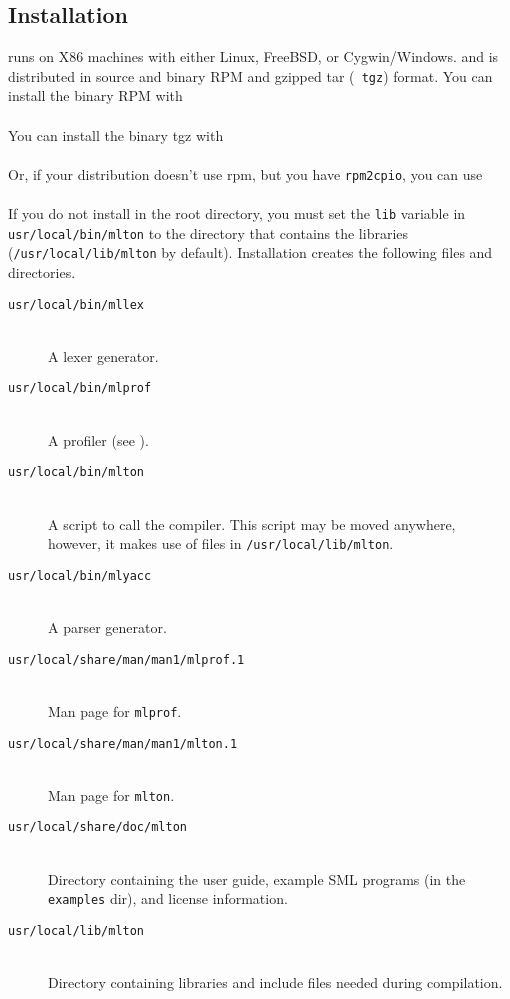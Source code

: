 
\subsection{Installation}

{\mlton} runs on X86 machines with either Linux, FreeBSD, or Cygwin/Windows.
and is distributed in source and binary RPM and gzipped tar ({\tt
tgz}) format.  You can install the binary RPM with\\
\hspace*{2em}{\tt rpm -i mlton-\version-1.i386.rpm}\\
You can install the binary tgz with\\
\hspace*{2em}{\tt zcat mlton-\version-1.i386.tgz | tar x}\\
Or, if your distribution doesn't use rpm, but you have {\tt rpm2cpio},
you can use\\
\hspace*{2em}{\tt rpm2cpio mlton-\version-1.i386.rpm | cpio -id}\\
If you do not install {\mlton} in the root directory, you must
set the {\tt lib} variable in {\tt usr/local/bin/mlton} to the
directory that contains the libraries ({\tt /usr/local/lib/mlton} by
default).
Installation creates the following files and directories.

\newcommand{\place}[1]{\item[\tt #1]\hspace{1in}\\}

\begin{description}

\place{usr/local/bin/mllex}
A lexer generator.

\place{usr/local/bin/mlprof}
A profiler (see ).

\place{usr/local/bin/mlton}
A script to call the compiler.
This script may be moved anywhere, however,
it makes use of files in {\tt /usr/local/lib/mlton}.

\place{usr/local/bin/mlyacc}
A parser generator.

\place{usr/local/share/man/man1/mlprof.1}
Man page for {\tt mlprof}.

\place{usr/local/share/man/man1/mlton.1}
Man page for {\tt mlton}.

\place{usr/local/share/doc/mlton}

Directory containing the user guide, example SML programs (in the {\tt examples}
dir), and license information.

\place{usr/local/lib/mlton}
Directory containing libraries and include files needed during
compilation.

\end{description}

